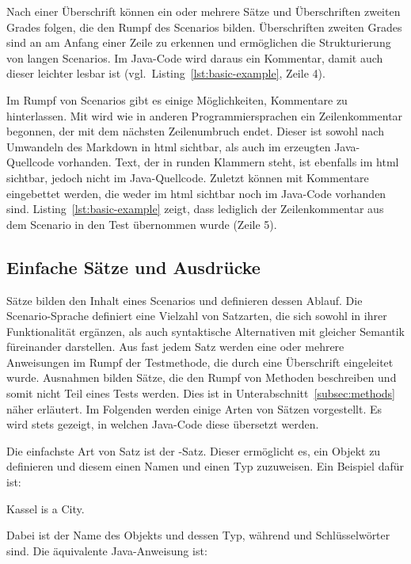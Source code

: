 Nach einer Überschrift können ein oder mehrere Sätze und Überschriften zweiten Grades folgen, die den Rumpf des Scenarios bilden.
Überschriften zweiten Grades sind an \mdcode{##} am Anfang einer Zeile zu erkennen und ermöglichen die Strukturierung von langen Scenarios.
Im Java-Code wird daraus ein Kommentar, damit auch dieser leichter lesbar ist (vgl.\ Listing~\ref{lst:basic-example}, Zeile 4).

Im Rumpf von Scenarios gibt es einige Möglichkeiten, Kommentare zu hinterlassen.
Mit \jcode{//} wird wie in anderen Programmiersprachen ein Zeilenkommentar begonnen, der mit dem nächsten Zeilenumbruch endet.
Dieser ist sowohl nach Umwandeln des Markdown in \ac{html} sichtbar, als auch im erzeugten Java-Quellcode vorhanden.
Text, der in runden Klammern  steht, ist ebenfalls im \ac{html} sichtbar, jedoch nicht im Java-Quellcode.
Zuletzt können mit  Kommentare eingebettet werden, die weder im \ac{html} sichtbar noch im Java-Code vorhanden sind.
Listing~\ref{lst:basic-example} zeigt, dass lediglich der Zeilenkommentar aus dem Scenario in den Test übernommen wurde (Zeile 5).

\subsection{Einfache Sätze und Ausdrücke}\label{subsec:simple-sentences-and-expressions}

Sätze bilden den Inhalt eines Scenarios und definieren dessen Ablauf.
Die Scenario-Sprache definiert eine Vielzahl von Satzarten, die sich sowohl in ihrer Funktionalität ergänzen, als auch syntaktische Alternativen mit gleicher Semantik füreinander darstellen.
Aus fast jedem Satz werden eine oder mehrere Anweisungen im Rumpf der Testmethode, die durch eine Überschrift eingeleitet wurde.
Ausnahmen bilden Sätze, die den Rumpf von Methoden beschreiben und somit nicht Teil eines Tests werden.
Dies ist in Unterabschnitt~\ref{subsec:methods} näher erläutert.
Im Folgenden werden einige Arten von Sätzen vorgestellt.
Es wird stets gezeigt, in welchen Java-Code diese übersetzt werden.

Die einfachste Art von Satz ist der -Satz.
Dieser ermöglicht es, ein Objekt zu definieren und diesem einen Namen und einen Typ zuzuweisen.
Ein Beispiel dafür ist:

\begin{codeblock}
    Kassel is a City.
\end{codeblock}

Dabei ist  der Name des Objekts und  dessen Typ, während  und  Schlüsselwörter sind.
Die äquivalente Java-Anweisung ist:


